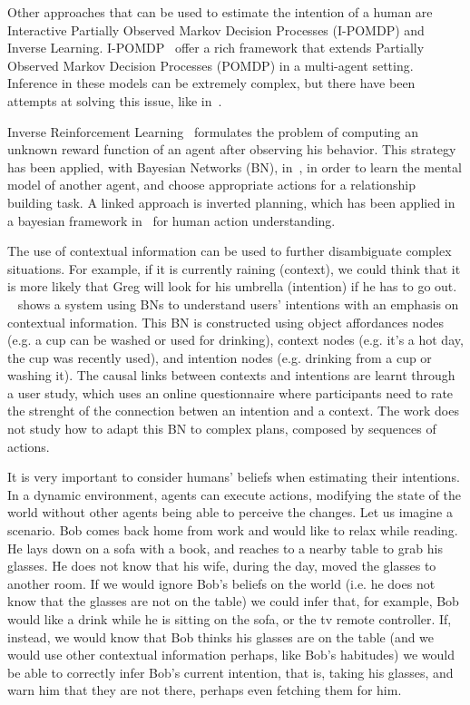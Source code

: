 Other approaches that can be used to estimate the intention of a human are Interactive Partially Observed Markov Decision Processes (I-POMDP) and Inverse Learning. I-POMDP~\citep{gmytrasiewicz2004interactive} offer a rich framework that extends Partially Observed Markov Decision Processes (POMDP) in a multi-agent setting. Inference in these models can be extremely complex, but there have been attempts at solving this issue, like in~\cite{doshi2009monte,hoang2013interactive}. 

Inverse Reinforcement Learning~\citep{ng2000algorithms} formulates the problem of computing an unknown reward function of an agent after observing his behavior. This strategy has been applied, with Bayesian Networks (BN), in~\cite{Nagai2015}, in order to learn the mental model of another agent, and choose appropriate actions for a relationship building task. A linked approach is inverted planning, which has been applied in a bayesian framework in~\cite{baker2009action}  for human action understanding.

The use of contextual information can be used to further disambiguate complex situations. For example, if it is currently raining (context), we could think that it is more likely that Greg will look for his umbrella (intention) if he has to go out. ~\cite{Liu2014} shows a system using BNs to understand users' intentions with an emphasis on contextual information. This BN is constructed using object affordances nodes (e.g. a cup can be washed or used for drinking), context nodes (e.g. it's a hot day, the cup was recently used), and intention nodes (e.g. drinking from a cup or washing it). The causal links between contexts and intentions are learnt through a user study, which uses an online questionnaire where participants need to rate the strenght of the connection betwen an intention and a context. The work does not study how to adapt this BN to complex plans, composed by sequences of actions.

It is very important to consider humans' beliefs when estimating their intentions. In a dynamic environment, agents can execute actions, modifying the state of the world without other agents being able to perceive the changes. Let us imagine a scenario. Bob comes back home from work and would like to relax while reading. He lays down on a sofa with a book, and reaches to a nearby table to grab his glasses. He does not know that his wife, during the day, moved the glasses to another room. If we would ignore Bob's beliefs on the world (i.e. he does not know that the glasses are not on the table) we could infer that, for example, Bob would like a drink while he is sitting on the sofa, or the tv remote controller. If, instead, we would know that Bob thinks his glasses are on the table (and we would use other contextual information perhaps, like Bob's habitudes) we would be able to correctly infer Bob's current intention, that is, taking his glasses, and warn him that they are not there, perhaps even fetching them for him. 

